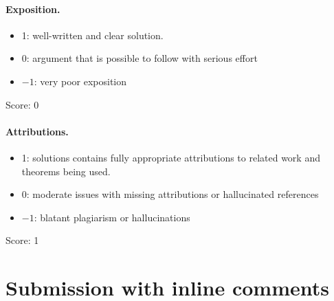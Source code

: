 \documentclass[11pt]{article}
\theoremstyle{remark}
\begin{document}
\paragraph{Exposition.}
\begin{itemize}
	\item  1: well-written and clear solution.
	\item  0: argument that is possible to follow with serious effort
	\item  $-1$: very poor exposition
\end{itemize}

\noindent Score: 0

\paragraph{Attributions.}
\begin{itemize}
	\item  1: solutions contains fully appropriate attributions
		to related work and theorems being used.
	\item  0: moderate issues with missing attributions or hallucinated references
	\item  $-1$: blatant plagiarism or hallucinations
\end{itemize}

\noindent Score: 1

\newpage
\section{Submission with inline comments}


\begin{abstract}
Let $(M,\omega)$ be a closed symplectic manifold and $D\subset M$ a
symplectic simple normal crossings divisor. After replacing $\omega$ by
a cohomologous symplectic form joined to it by a path along which $D$
stays simple normal crossings, we construct a tame almost complex
structure $J$ such that every point of $M$ has smooth complex
coordinates $(z_1,\dots,z_n)$ in which $z_1,\dots,z_r$ are
$J$-holomorphic and $D=\{z_1\cdots z_r=0\}$. The proof combines the
regularization theorem of Farajzadeh Tehrani, McLean and Zinger with
auxiliary approximately holomorphic divisors arranged in a forest of
binary trees, whose recursive frames give exact Laurent-monomial
transitions between nested systems of local defining functions, and
with a convexity property of tame structures that patches local
solutions exactly.
\end{abstract}
\end{document}
